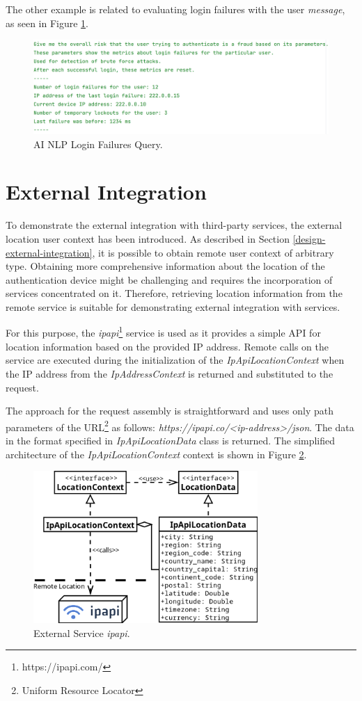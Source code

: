 The other example is related to evaluating login failures with the user \textit{message}, as seen in Figure \ref{fig:impl-ai-login-message}.

\begin{figure}[htbp]
  \centering
  \includegraphics[width=1\textwidth]{img/sections/6-implementation/aiLoginFailureMessage.png}
  \caption{AI NLP Login Failures Query.}
  \label{fig:impl-ai-login-message}
\end{figure}

\section{External Integration}
To demonstrate the external integration with third-party services, the external location user context has been introduced.
As described in Section \ref{design-external-integration}, it is possible to obtain remote user context of arbitrary type.
Obtaining more comprehensive information about the location of the authentication device might be challenging and requires the incorporation of services concentrated on it.
Therefore, retrieving location information from the remote service is suitable for demonstrating external integration with services. 

\newpage

For this purpose, the \textit{ipapi}\footnote{https://ipapi.com/} service is used as it provides a simple API for location information based on the provided IP address.
Remote calls on the service are executed during the initialization of the \textit{IpApiLocationContext} when the IP address from the \textit{IpAddressContext} is returned and substituted to the request.

The approach for the request assembly is straightforward and uses only path parameters of the URL\footnote{Uniform Resource Locator} as follows:
\textit{https://ipapi.co/<ip-address>/json}.
The data in the format specified in \textit{IpApiLocationData} class is returned.
The simplified architecture of the \textit{IpApiLocationContext} context is shown in Figure \ref{fig:impl-external-ipapi}.

\begin{figure}[htbp]
  \centering
  \includegraphics[width=0.76\textwidth]{img/sections/6-implementation/location-diagram-ipapi.png}
  \caption{External Service \textit{ipapi}.}
  \label{fig:impl-external-ipapi}
\end{figure}

\shorthandoff{-}
